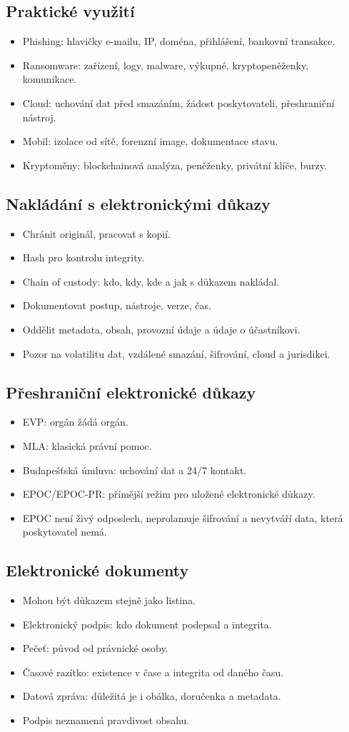 \documentclass[10pt,a4paper]{article}
\newcommand{\blok}[1]{\subsection*{#1}}
\begin{document}
\blok{Praktické využití}
\begin{itemize}
  \item Phishing: hlavičky e-mailu, IP, doména, přihlášení, bankovní transakce.
  \item Ransomware: zařízení, logy, malware, výkupné, kryptopeněženky, komunikace.
  \item Cloud: uchování dat před smazáním, žádost poskytovateli, přeshraniční nástroj.
  \item Mobil: izolace od sítě, forenzní image, dokumentace stavu.
  \item Kryptoměny: blockchainová analýza, peněženky, privátní klíče, burzy.
\end{itemize}

\blok{Nakládání s elektronickými důkazy}
\begin{itemize}
  \item Chránit originál, pracovat s kopií.
  \item Hash pro kontrolu integrity.
  \item Chain of custody: kdo, kdy, kde a jak s důkazem nakládal.
  \item Dokumentovat postup, nástroje, verze, čas.
  \item Oddělit metadata, obsah, provozní údaje a údaje o účastníkovi.
  \item Pozor na volatilitu dat, vzdálené smazání, šifrování, cloud a jurisdikci.
\end{itemize}

\blok{Přeshraniční elektronické důkazy}
\begin{itemize}
  \item EVP: orgán žádá orgán.
  \item MLA: klasická právní pomoc.
  \item Budapešťská úmluva: uchování dat a 24/7 kontakt.
  \item EPOC/EPOC-PR: přímější režim pro uložené elektronické důkazy.
  \item EPOC není živý odposlech, neprolamuje šifrování a nevytváří data, která poskytovatel nemá.
\end{itemize}

\blok{Elektronické dokumenty}
\begin{itemize}
  \item Mohou být důkazem stejně jako listina.
  \item Elektronický podpis: kdo dokument podepsal a integrita.
  \item Pečeť: původ od právnické osoby.
  \item Časové razítko: existence v čase a integrita od daného času.
  \item Datová zpráva: důležitá je i obálka, doručenka a metadata.
  \item Podpis neznamená pravdivost obsahu.
\end{itemize}
\end{document}
